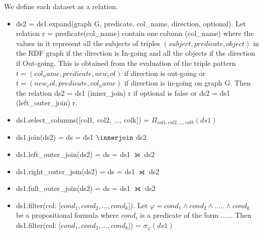 We define each dataset as a relation.
\begin{itemize}
    \item ds2 = ds1.expand(graph G, predicate, col\_name, direction, optional). Let relation r = predicate(col\_name) contain one column (col\_name) where the values in it represent all the subjects of triples $(subject, predicate, object)$ in the RDF graph if the direction is In-going and all the objects if the direction if Out-going. This is obtained from the evaluation of the triple pattern $t = (col_name, predicate, new_col)$ if direction is out-going or $t = (new_col, predicate, col_name)$ if direction is in-going on graph G. 
    Then the relation ds2 = ds1 (inner\_join) r if optional is false or ds2 = ds1 (left\_outer\_join) r. 
\end{itemize}{}

\begin{itemize}
    \item ds1.select\_columns([col1, col2, ..., colk]) = $\Pi_{col1, col2, ..., colk}(ds1)$
\end{itemize}{}

\begin{itemize}
    \item ds1.join(ds2) = ds = ds1 $\innerjoin$ ds2 
\end{itemize}{}

\begin{itemize}
    \item ds1.left\_outer\_join(ds2) = ds = ds1 $\leftouterjoin$ ds2 
\end{itemize}{}

\begin{itemize}
    \item ds1.right\_outer\_join(ds2) = ds = ds1 $\rightouterjoin$ ds2 
\end{itemize}{}



\begin{itemize}
    \item ds1.full\_outer\_join(ds2) = ds = ds1 $\fullouterjoin$ ds2
\end{itemize}{}

\begin{itemize}
    \item ds1.filter({col: [$cond_1, cond_2, ..., cond_k$]}). Let $\varphi = cond_1 \land cond_2 \land ..... \land cond_k$ be a propositional formula where $cond_i$ is a predicate of the form ......
    Then ds1.filter({col: [$cond_1, cond_2, ..., cond_k$]}) = $\sigma_{\varphi}(ds1)$
\end{itemize}{}


